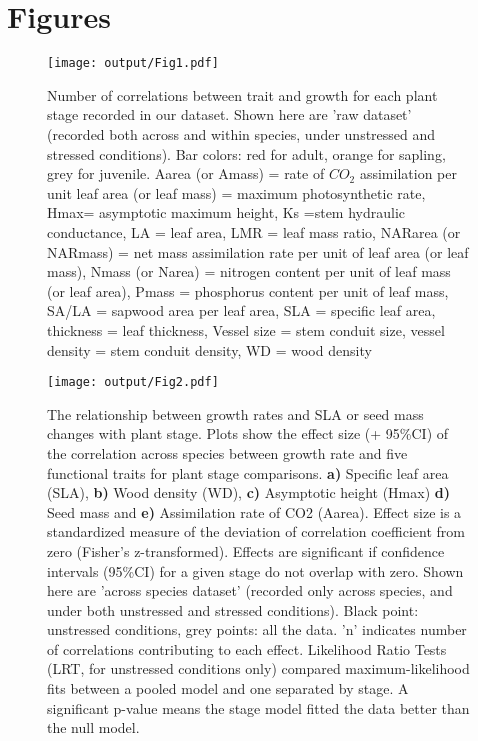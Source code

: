 \documentclass[a4paper]{article}\usepackage[]{graphicx}\usepackage[]{color}
\begin{document}
\clearpage
\linespread{1}

\nocite{*}
 
\label{references}


\newpage
\section*{Figures}

\begin{figure}[htbp]
\centering
\texttt{[image: output/Fig1.pdf]}
\caption{Number of correlations between trait and growth for each plant stage recorded in our dataset. Shown here are 'raw dataset' (recorded both across and within species, under unstressed and stressed conditions). Bar colors: red for adult, orange for sapling, grey for juvenile. Aarea (or Amass) = rate of $CO_{2}$ assimilation per unit leaf area (or leaf mass) = maximum photosynthetic rate, Hmax= asymptotic maximum height,  Ks =stem hydraulic conductance, LA = leaf area, LMR = leaf mass ratio, NARarea (or NARmass) = net mass assimilation rate per unit of leaf area (or leaf mass), Nmass (or Narea) = nitrogen content per unit of leaf mass (or leaf area), Pmass = phosphorus content per unit of leaf mass, SA/LA = sapwood area per leaf area, SLA = specific leaf area, thickness = leaf thickness, Vessel size = stem conduit size, vessel density = stem conduit density, WD = wood density}
\label{Fig1}
\end{figure}


\begin{figure}[htbp]
\centering
\texttt{[image: output/Fig2.pdf]}
\caption{The relationship between growth rates and SLA or seed mass changes with plant stage. Plots show the effect size (+ 95\%CI) of the correlation across species between growth rate and five functional traits for plant stage comparisons. \textbf{a)} Specific leaf area (SLA), \textbf{b)} Wood density (WD), \textbf{c)} Asymptotic height (Hmax) \textbf{d)} Seed mass and \textbf{e)} Assimilation rate of CO2 (Aarea). Effect size is a standardized measure of the deviation of correlation coefficient from zero (Fisher's z-transformed). Effects are significant if confidence intervals (95\%CI) for a given stage do not overlap with zero. Shown here are 'across species dataset' (recorded only across species, and under both unstressed and stressed conditions). Black point: unstressed conditions, grey points: all the data. 'n' indicates number of correlations contributing to each effect. Likelihood Ratio Tests (LRT, for unstressed conditions only) compared maximum-likelihood fits between a pooled model and one separated by stage. A significant p-value means the stage model fitted the data better than the null model. 
}
\label{Fig2}
\end{figure}
\end{document}
